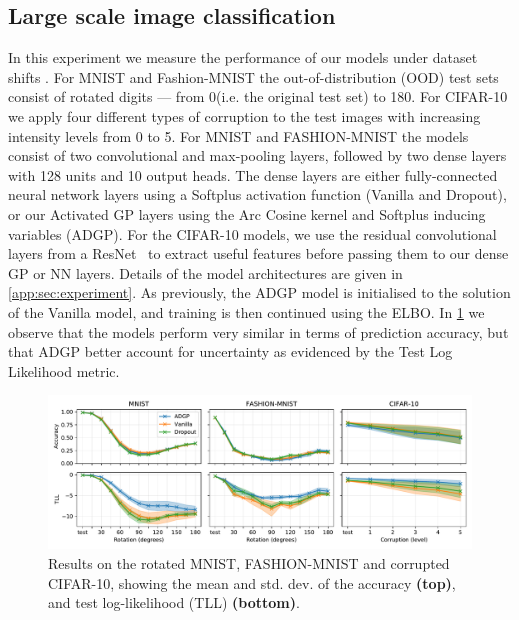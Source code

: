 \subsection{Large scale image classification}
In this experiment we measure the performance of our models under dataset shifts \citep{Ovadia2019}. For MNIST and Fashion-MNIST the out-of-distribution (OOD) test sets consist of rotated digits --- from 0\textdegree (i.e. the original test set) to 180\textdegree. For CIFAR-10 we apply four different types of corruption to the test images with increasing intensity levels from 0 to 5. For MNIST and FASHION-MNIST the models consist of two convolutional and max-pooling layers, followed by two dense layers with 128 units and 10 output heads. The dense layers are either fully-connected neural network layers using a Softplus activation function (Vanilla and Dropout), or our Activated GP layers using the Arc Cosine kernel and Softplus inducing variables (ADGP). For the CIFAR-10 models, we use the residual convolutional layers from a ResNet~\citep{he2016deep} to extract useful features before passing them to our dense GP or NN layers. Details of the model architectures are given in \cref{app:sec:experiment}. As previously, the ADGP model is initialised to the solution of the Vanilla model, and training is then continued using the ELBO. In \cref{fig:image-classification} we observe that the models perform very similar in terms of prediction accuracy, but that ADGP better account for uncertainty as evidenced by the Test Log Likelihood metric.%

\begin{figure}[t]
    \centering   
    \includegraphics[width=\textwidth]{image_classification}
    \caption{Results on the rotated MNIST, FASHION-MNIST and corrupted CIFAR-10, showing the mean and std. dev. of the accuracy \textbf{(top)}, and test log-likelihood (TLL) \textbf{(bottom)}.}
    \label{fig:image-classification}
\end{figure}

